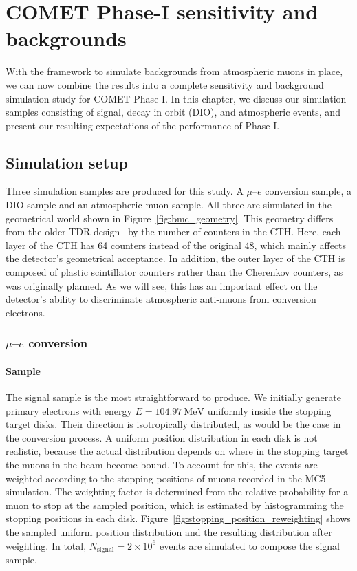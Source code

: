 \chapter{COMET Phase-I sensitivity and backgrounds}

With the framework to simulate backgrounds from atmospheric muons in place, we
can now combine the results into a complete sensitivity and background
simulation study for COMET Phase-I. In this chapter, we discuss our simulation
samples consisting of signal, decay in orbit (DIO), and atmospheric events, and
present our resulting expectations of the performance of Phase-I.

\section{Simulation setup}
Three simulation samples are produced for this study. A $\mu$--$e$ conversion
sample, a DIO sample and an atmospheric muon sample. All three are simulated in
the geometrical world shown in Figure~\ref{fig:bmc_geometry}. This geometry
differs from the older TDR design~\cite{the_comet_collaboration_comet_2020} by
the number of counters in the CTH. Here, each layer of the CTH has 64 counters
instead of the original 48, which mainly affects the detector's geometrical
acceptance. In addition, the outer layer of the CTH is composed of plastic
scintillator counters rather than the Cherenkov counters, as was originally
planned. As we will see, this has an important effect on the detector's ability
to discriminate atmospheric anti-muons from conversion electrons.

\subsection{\texorpdfstring{$\mu$--$e$}{Muon to electron} conversion} 

\subsubsection{Sample}

The signal sample is the most straightforward to produce. We initially generate
primary electrons with energy $E=\SI{104.97}{\MeV}$ uniformly inside the
stopping target disks. Their direction is isotropically distributed, as would be
the case in the conversion process. A uniform position distribution in each disk
is not realistic, because the actual distribution depends on where in the
stopping target the muons in the beam become bound. To account for this, the
events are weighted according to the stopping positions of muons recorded in the
MC5 simulation. The weighting factor is determined from the relative probability
for a muon to stop at the sampled position, which is estimated by histogramming
the stopping positions in each disk.
Figure~\ref{fig:stopping_position_reweighting} shows the sampled uniform
position distribution and the resulting distribution after weighting. In total,
$N_\mathrm{signal} = 2\times 10^6$ events are simulated to compose the signal
sample.

